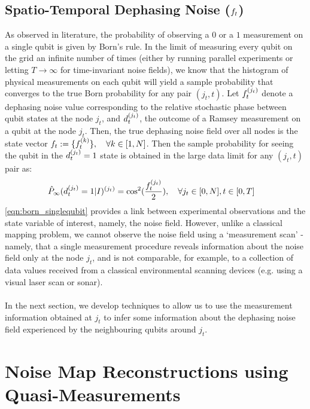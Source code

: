 \subsection{Spatio-Temporal Dephasing Noise ($f_{ t}$)}

As observed in literature, the probability of observing a $0$ or a $1$ measurement on a single qubit is given by Born's rule. In the limit of measuring every qubit on the grid an infinite number of times (either by running parallel experiments or letting $T \to \infty$ for time-invariant noise fields), we know that the histogram of physical measurements on each qubit will yield a sample probability that converges to the true Born probability for any pair $(j_t,t)$. Let $f^{( j_t )}_{t}$ denote a  dephasing noise value corresponding to the relative stochastic phase between qubit states at the node $j_t$, and $d^{( j_t )}_{t}$, the outcome of a Ramsey measurement on a qubit at the node $j_t$. Then, the true dephasing noise field over all nodes is the state vector $ f_{ t}:=\{f^{( k )}_{t} \}, \quad \forall k \in [1,N]$. Then the sample probability for seeing the qubit in the  $d^{( j_t )}_{t}=1$ state is obtained in the large data limit for any $(j_t, t)$ pair as: \\
\begin{align}
\hat{P}_\infty(d^{( j_t )}_{t}=1|I)^{(j_t)} & = \cos^2(\frac{f^{( j_t )}_{t}}{2}), \quad \forall j_t \in [0, N], t \in [0, T] \label{eqn:born_singlequbit}
\end{align}
\cref{eqn:born_singlequbit} provides a link between experimental observations and the state variable of interest, namely, the noise field. However, unlike a classical mapping problem, we cannot observe the noise field using a `measurement scan' - namely, that a single measurement procedure reveals information about the noise field only at the node $j_t$, and is not comparable, for example, to a collection of data values received from a classical environmental scanning devices (e.g. using a visual laser scan or sonar). \\
\\
In the next section, we develop techniques to allow us to use the measurement information obtained at $j_t$ to infer some information about the dephasing noise field experienced by the neighbouring qubits around $j_t$.  


\section{Noise Map Reconstructions using Quasi-Measurements }

